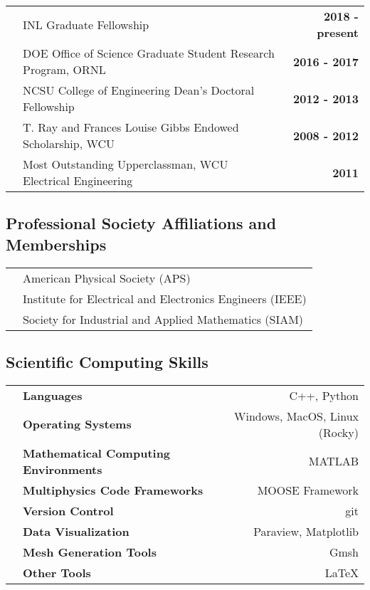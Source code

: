 \documentclass{article}
\begin{document}
	\begin{tabularx}{\textwidth}{l X r}
		\hspace{2em} & INL Graduate Fellowship & \textbf{2018 - present} \\
					       & DOE Office of Science Graduate Student Research Program, ORNL & \textbf{2016 - 2017} \\
					       & NCSU College of Engineering Dean's Doctoral Fellowship & \textbf{2012 - 2013} \\
					       & T. Ray and Frances Louise Gibbs Endowed Scholarship, WCU & \textbf{2008 - 2012} \\
					       & Most Outstanding Upperclassman, WCU Electrical Engineering & \textbf{2011}
	\end{tabularx}

\subsection*{Professional Society Affiliations and Memberships}

\begin{tabularx}{\textwidth}{l l}
	\hspace{2em} & American Physical Society (APS) \\
				 & Institute for Electrical and Electronics Engineers (IEEE) \\
				 & Society for Industrial and Applied Mathematics (SIAM)
\end{tabularx}

\subsection*{Scientific Computing Skills}

	\begin{tabularx}{\textwidth}{l X r}
		\hspace {2em} & \textbf{Languages} & C++, Python \\
					        & \textbf{Operating Systems} & Windows, MacOS, Linux (Rocky) \\
					        & \textbf{Mathematical Computing Environments} & MATLAB \\
					        & \textbf{Multiphysics Code Frameworks} & MOOSE Framework \\
					        & \textbf{Version Control} & git \\
					        & \textbf{Data Visualization} & Paraview, Matplotlib \\
					        & \textbf{Mesh Generation Tools} & Gmsh \\
					        & \textbf{Other Tools} & \LaTeX
	\end{tabularx}
\end{document}
